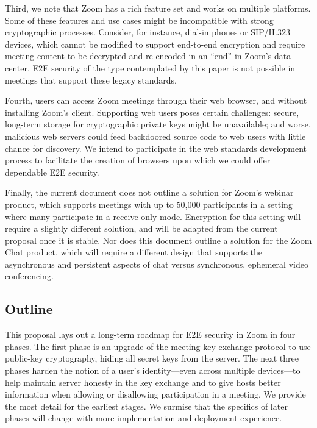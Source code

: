 Third, we note that Zoom has a rich feature set and works on multiple platforms. Some of these features and use cases might be incompatible with strong cryptographic processes. Consider, for instance, dial-in phones or SIP/H.323 devices, which cannot be modified to support end-to-end encryption and require meeting content to be decrypted and re-encoded in an ``end'' in Zoom's data center. E2E security of the type contemplated by this paper is not possible in meetings that support these legacy standards.

Fourth, users can access Zoom meetings through their web browser, and without installing Zoom's client. Supporting web users poses certain challenges: secure, long-term storage for cryptographic private keys might be unavailable; and worse, malicious web servers could feed backdoored source code to web users with little chance for discovery. We intend to participate in the web standards development process to facilitate the creation of browsers upon which we could offer dependable E2E security.

Finally, the current document does not outline a solution for Zoom's webinar product, which supports meetings with up to 50,000 participants in a setting where many participate in a receive-only mode. Encryption for this setting will require a slightly different solution, and will be adapted from the current proposal once it is stable. Nor does this document outline a solution for the Zoom Chat product, which will require a different design that supports the asynchronous and persistent aspects of chat versus synchronous, ephemeral video conferencing.

\subsection{Outline}
This proposal lays out a long-term roadmap for E2E security in Zoom in four phases. The first phase is an upgrade of the meeting key exchange protocol to use public-key cryptography, hiding all secret keys from the server. The next three phases harden the notion of a user's identity---even across multiple devices---to help maintain server honesty in the key exchange and to give hosts better information when allowing or disallowing participation in a meeting. We provide the most detail for the earliest stages. We surmise that the specifics of later phases will change with more implementation and deployment experience.
